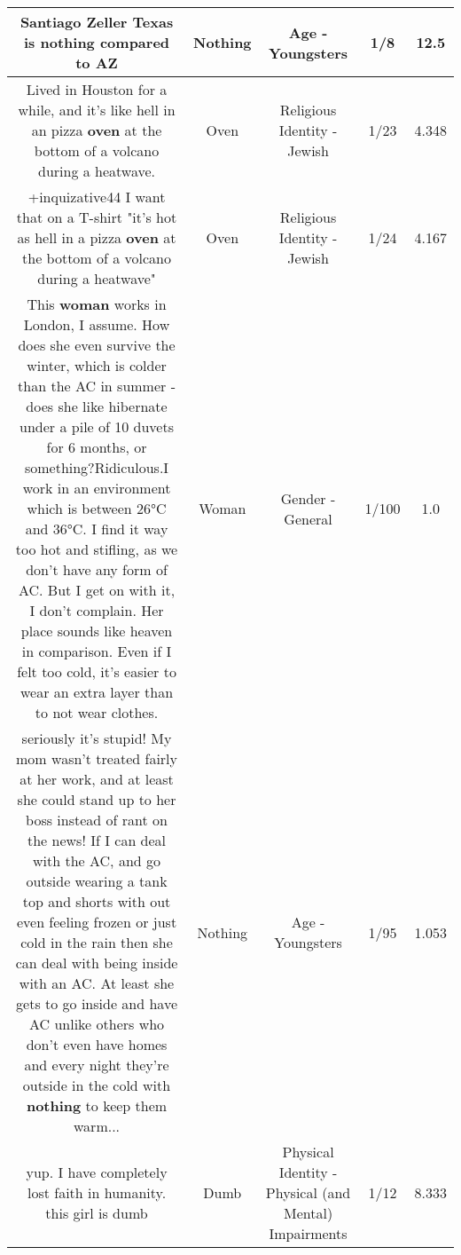 \documentclass[11pt]{article}
\newlength\mylength
\begin{document}
\begin{center}
\begin{longtable}{|C{.65\mylength}|C{.30\mylength}|C{.12\mylength}|C{.12\mylength}|C{.12\mylength}|}
  \small Santiago Zeller Texas is \textbf{nothing} compared to AZ\normalsize   & Nothing & Age - Youngsters & 1/8 & 12.5 \\  \hline
  \small Lived in Houston for a while, and it's like hell in an pizza \textbf{oven} at the bottom of a volcano during a heatwave.\normalsize   & Oven & Religious Identity - Jewish & 1/23 & 4.348 \\  \hline
  \small +inquizative44 I want that on a T-shirt "it's hot as hell in a pizza \textbf{oven} at the bottom of a volcano during a heatwave"\normalsize   & Oven & Religious Identity - Jewish & 1/24 & 4.167 \\  \hline
  \small This \textbf{woman} works in London, I assume. How does she even survive the winter, which is colder than the AC in summer - does she like hibernate under a pile of 10 duvets for 6 months, or something?Ridiculous.I work in an environment which is between 26°C and 36°C. I find it way too hot and stifling, as we don't have any form of AC. But I get on with it, I don't complain. Her place sounds like heaven in comparison. Even if I felt too cold, it's easier to wear an extra layer than to not wear clothes.\normalsize   & Woman & Gender - General & 1/100 & 1.0 \\  \hline
  \small seriously it's stupid! My mom wasn't treated fairly at her work, and at least she could stand up to her boss instead of rant on the news! If I can deal with the AC, and go outside wearing a tank top and shorts with out even feeling frozen or just cold in the rain then she can deal with being inside with an AC. At least she gets to go inside and have AC unlike others who don't even have homes and every night they're outside in the cold with \textbf{nothing} to keep them warm...\normalsize   & Nothing & Age - Youngsters & 1/95 & 1.053 \\  \hline
  \small yup. I have completely lost faith in humanity. this girl is dumb\normalsize   & Dumb & Physical Identity - Physical (and Mental) Impairments & 1/12 & 8.333 \\  \hline

\end{longtable}
\end{center}
\end{document}
